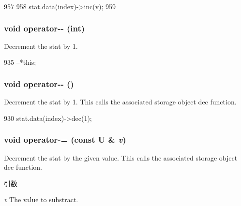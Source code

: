 \begin{DoxyCode}
957     {
958         stat.data(index)->inc(v);
959     }
\end{DoxyCode}
\hypertarget{classStats_1_1ScalarProxy_a132d549c024fd011da9b2f96319c5395}{
\subsubsection[{operator-\/-\/}]{\setlength{\rightskip}{0pt plus 5cm}void operator-\/-\/ (int)}}
\label{classStats_1_1ScalarProxy_a132d549c024fd011da9b2f96319c5395}
Decrement the stat by 1. 


\begin{DoxyCode}
935 { --*this; }
\end{DoxyCode}
\hypertarget{classStats_1_1ScalarProxy_a59f5b5b0d341cf7bd8d23f8f9f96edce}{
\subsubsection[{operator-\/-\/}]{\setlength{\rightskip}{0pt plus 5cm}void operator-\/-\/ ()}}
\label{classStats_1_1ScalarProxy_a59f5b5b0d341cf7bd8d23f8f9f96edce}
Decrement the stat by 1. This calls the associated storage object dec function. 


\begin{DoxyCode}
930 { stat.data(index)->dec(1); }
\end{DoxyCode}
\hypertarget{classStats_1_1ScalarProxy_a7f5bf4b1be35c726f936b48640ee3b4b}{
\subsubsection[{operator-\/=}]{\setlength{\rightskip}{0pt plus 5cm}void operator-\/= (const U \& {\em v})}}
\label{classStats_1_1ScalarProxy_a7f5bf4b1be35c726f936b48640ee3b4b}
Decrement the stat by the given value. This calls the associated storage object dec function. 
\begin{DoxyParams}{引数}
\item[{\em v}]The value to substract. \end{DoxyParams}



